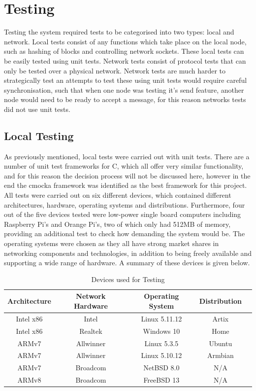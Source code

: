 \documentclass[a4paper, 11pt]{report}
\begin{document}
\chapter{Testing} \label{test}
Testing the system required tests to be categorised into two types: local and network. Local tests consist of any functions which take place on the local node, such as \gls{hashing} of blocks and controlling network sockets. These local tests can be easily tested using unit tests. Network tests consist of protocol tests that can only be tested over a physical network. Network tests are much harder to strategically test an attempts to test these using unit tests would require careful synchronisation, such that when one node was testing it's send feature, another node would need to be ready to accept a message, for this reason networks tests did not use unit tests.

\section{Local Testing} \label{loctest}
As previously mentioned, local tests were carried out with unit tests. There are a number of unit test frameworks for C, which all offer very similar functionality, and for this reason the decision process will not be discussed here, however in the end the cmocka\cite{cmocka} framework was identified as the best framework for this project. All tests were carried out on six different devices, which contained different architectures, hardware, operating systems and distributions. Furthermore, four out of the five devices tested were low-power single board computers including Raspberry Pi's and Orange Pi's, two of which only had 512MB of memory, providing an additional test to check how demanding the system would be. The operating systems were chosen as they all have strong market shares in networking components and technologies, in addition to being freely available and supporting a wide range of hardware. A summary of these devices is given below.

\begin{table}[H]
\centering
\begin{tabular}{ |c|c|c|c|c| } 
\hline
Architecture & Network Hardware & Operating System & Distribution\\
\hline
Intel x86 & Intel & Linux 5.11.12 & Artix\\
Intel x86 & Realtek & Windows 10 & Home\\
ARMv7 & Allwinner & Linux 5.3.5 & Ubuntu\\
ARMv7 & Allwinner & Linux 5.10.12 & Armbian\\
ARMv7 & Broadcom & NetBSD 8.0 & N/A\\
ARMv8 & Broadcom & FreeBSD 13 & N/A\\
\hline
\end{tabular}
\caption{Devices used for Testing}
\label{tab:testdevices}
\end{table}
\end{document}
